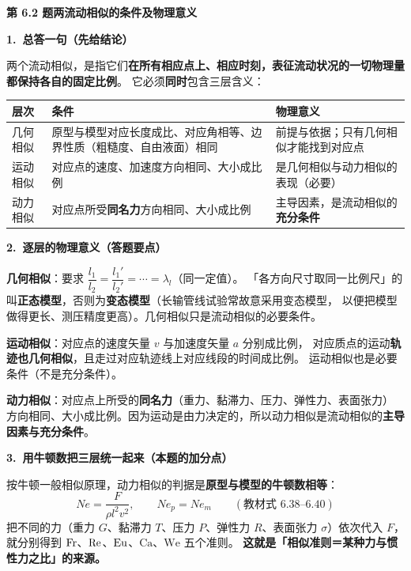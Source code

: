 \noindent\textbf{第 6.2 题\quad 两流动相似的条件及物理意义}

\begin{jie}
\textbf{1.\ 总答一句（先给结论）}

两个流动相似，是指它们\textbf{在所有相应点上、相应时刻，表征流动状况的一切物理量都保持各自的固定比例}。
它必须\textbf{同时}包含三层含义：

\begin{center}
\begin{tabularx}{\textwidth}{@{}lXX@{}}
\toprule
层次 & 条件 & 物理意义 \\
\midrule
几何相似 & 原型与模型对应长度成比、对应角相等、边界性质（粗糙度、自由液面）相同 & 前提与依据；只有几何相似才能找到对应点 \\
运动相似 & 对应点的速度、加速度方向相同、大小成比例 & 是几何相似与动力相似的表现（必要） \\
动力相似 & 对应点所受\textbf{同名力}方向相同、大小成比例 & 主导因素，是流动相似的\textbf{充分条件} \\
\bottomrule
\end{tabularx}
\end{center}

\textbf{2.\ 逐层的物理意义（答题要点）}
\begin{xiaowen}
\item \textbf{几何相似}：要求 $\dfrac{l_1}{l_2}=\dfrac{l_1'}{l_2'}=\cdots=\lambda_l$（同一定值）。
「各方向尺寸取同一比例尺」的叫\textbf{正态模型}，否则为\textbf{变态模型}（长输管线试验常故意采用变态模型，
以便把模型做得更长、测压精度更高）。几何相似只是流动相似的必要条件。
\item \textbf{运动相似}：对应点的速度矢量 $v$ 与加速度矢量 $a$ 分别成比例，
对应质点的运动\textbf{轨迹也几何相似}，且走过对应轨迹线上对应线段的时间成比例。
运动相似也是必要条件（不是充分条件）。
\item \textbf{动力相似}：对应点上所受的\textbf{同名力}（重力、黏滞力、压力、弹性力、表面张力）
方向相同、大小成比例。因为运动是由力决定的，所以动力相似是流动相似的\textbf{主导因素与充分条件}。
\end{xiaowen}

\textbf{3.\ 用牛顿数把三层统一起来（本题的加分点）}

按牛顿一般相似原理，动力相似的判据是\textbf{原型与模型的牛顿数相等}：
\[ Ne=\frac{F}{\rho l^{2}v^{2}},\qquad Ne_p=Ne_m\qquad(\text{教材式 6.38--6.40}) \]
把不同的力（重力 $G$、黏滞力 $T$、压力 $P$、弹性力 $R$、表面张力 $\sigma$）依次代入 $F$，
就分别得到 $\mathrm{Fr}$、$\mathrm{Re}$、$\mathrm{Eu}$、$\mathrm{Ca}$、$\mathrm{We}$ 五个准则。
\textbf{这就是「相似准则＝某种力与惯性力之比」的来源。}


\end{jie}
